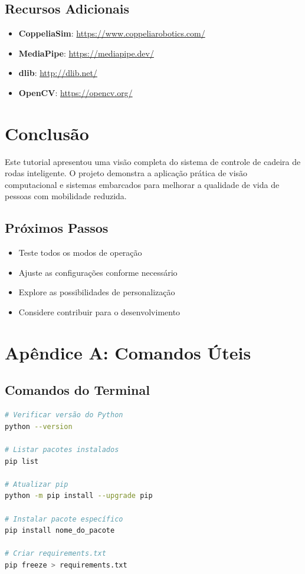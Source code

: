\documentclass[12pt,a4paper]{article}
\begin{document}
\subsection{Recursos Adicionais}

\begin{itemize}
    \item \textbf{CoppeliaSim}: \url{https://www.coppeliarobotics.com/}
    \item \textbf{MediaPipe}: \url{https://mediapipe.dev/}
    \item \textbf{dlib}: \url{http://dlib.net/}
    \item \textbf{OpenCV}: \url{https://opencv.org/}
\end{itemize}

\section{Conclusão}

Este tutorial apresentou uma visão completa do sistema de controle de cadeira de rodas inteligente. O projeto demonstra a aplicação prática de visão computacional e sistemas embarcados para melhorar a qualidade de vida de pessoas com mobilidade reduzida.

\subsection{Próximos Passos}

\begin{itemize}
    \item Teste todos os modos de operação
    \item Ajuste as configurações conforme necessário
    \item Explore as possibilidades de personalização
    \item Considere contribuir para o desenvolvimento
\end{itemize}

\appendix

\section{Apêndice A: Comandos Úteis}

\subsection{Comandos do Terminal}

\begin{lstlisting}[language=bash]
# Verificar versão do Python
python --version

# Listar pacotes instalados
pip list

# Atualizar pip
python -m pip install --upgrade pip

# Instalar pacote específico
pip install nome_do_pacote

# Criar requirements.txt
pip freeze > requirements.txt
\end{lstlisting}
\end{document}
